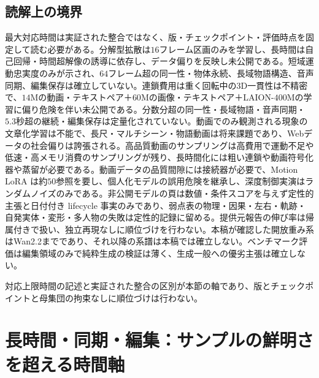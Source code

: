 \documentclass[lualatex,a4paper,10pt]{jlreq}
\begin{document}
\subsection*{読解上の境界}
最大対応時間は実証された整合ではなく、版・チェックポイント・評価時点を固定して読む必要がある\autocite{btd070,btd071,btd073,btd074,btd075,btd077,btd124,btd138}。分解型拡散は$16$フレーム区画のみを学習し、長時間は自己回帰・時間超解像の誘導に依存し、データ偏りを反映し未公開である\autocite{btd070}。短域運動忠実度のみが示され、$64$フレーム超の同一性・物体永続、長域物語構造、音声同期、編集保存は確立していない\autocite{btd070}。連鎖費用は重く回転中の3D一貫性は不精密で、$14$Mの動画・テキストペア＋$60$Mの画像・テキストペア＋LAION-$400$Mの学習に偏り危険を伴い未公開である\autocite{btd071}。分数分超の同一性・長域物語・音声同期・$5.3$秒超の継続・編集保存は定量化されていない\autocite{btd074,btd075}。動画でのみ観測される現象の文章化学習は不能で、長尺・マルチシーン・物語動画は将来課題であり、Webデータの社会偏りは誇張される\autocite{btd073}。高品質動画のサンプリングは高費用で運動不足や低速・高メモリ消費のサンプリングが残り、長時間化には粗い連鎖や動画符号化器や蒸留が必要である\autocite{btd073}。動画データの品質間隙には接続器が必要で、Motion LoRA は約$50$参照を要し、個人化モデルの誤用危険を継承し、深度制御実演はランダムノイズのみである\autocite{btd074}。非公開モデルの頁は数値・条件スコアを与えず定性的主張と日付付き lifecycle 事実のみであり、弱点表の物理・因果・左右・軌跡・自発実体・変形・多人物の失敗は定性的記録に留める\autocite{btd077}。提供元報告の伸び率は帰属付きで扱い、独立再現なしに順位づけを行わない。本稿が確認した開放重み系はWan2.2までであり、それ以降の系譜は本稿では確立しない\autocite{btd124}。ベンチマーク評価は編集領域のみで純粋生成の検証は薄く、生成一般への優劣主張は確立しない\autocite{btd138}。

対応上限時間の記述と実証された整合の区別が本節の軸であり、版とチェックポイントと母集団の拘束なしに順位づけは行わない\autocite{btd070,btd071,btd073,btd074,btd075,btd077,btd124,btd138}。

\section{長時間・同期・編集：サンプルの鮮明さを超える時間軸}
\label{sec:temporal}
\end{document}
